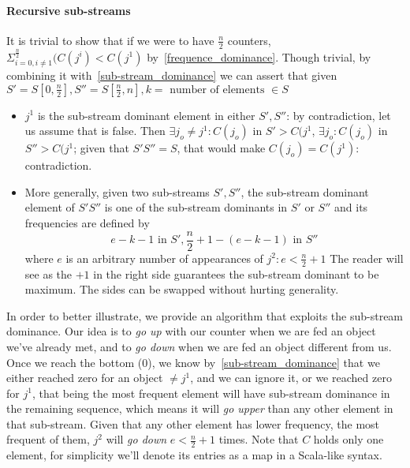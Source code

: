 \documentclass{article}
\begin{document}
\paragraph{Recursive sub-streams} It is trivial to show that if we were to have
$\frac{n}{2}$ counters, $\Sigma^{\frac{n}{2}}_{i = 0, i \neq 1}(C(j^{i}) < C(j^{1})$
by~\ref{frequence_dominance}.
Though trivial, by combining it with~\ref{sub-stream_dominance} we can assert that
given $S' = S[0, \frac{n}{2}], S'' = S[\frac{n}{2}, n], k = \textrm{ number of elements } \in S$
    \begin{itemize}
    \item \textbf{$j^{1}$} is the sub-stream dominant element in either $S', S''$:
    by contradiction, let us assume that is false. Then
    $\exists j_{o} \neq j^{1}: C(j_{o})$ in $S' > C(j^{1}$, $\exists j_{o}: C(j_{o})$ in $S'' > C(j^{1}$;
    given that $S'S'' = S$, that would make $C(j_{o}) = C(j^{1})$: contradiction.
    \item More generally, given two sub-streams $S', S''$, the sub-stream
    dominant element of $S'S''$ is one of the sub-stream dominants in
    $S'$ or $S''$ and its frequencies are defined by
        \begin{equation}
        e - k - 1\textrm{ in } S', \frac{n}{2} + 1 - (e - k - 1) \textrm{ in } S''
        \end{equation}
    where $e$ is an arbitrary number of appearances of $j^{2}: e < \frac{n}{2} + 1$
    The reader will see as the $+1$ in the right side guarantees the
    sub-stream dominant to be maximum.
    The sides can be swapped without hurting generality.
    \end{itemize}

In order to better illustrate, we provide an algorithm that exploits the
sub-stream dominance.
Our idea is to \emph{go up} with our counter when we are fed an object we've
already met, and to \emph{go down} when we are fed an object different from
us.
Once we reach the bottom (0), we know by~\ref{sub-stream_dominance} that
we either reached zero for an object $\neq j^{1}$, and we can ignore it,
or we reached zero for $j^{1}$, that being the most frequent element will
have sub-stream dominance in the remaining sequence, which means it will
\emph{go upper} than any other element in that sub-stream.
Given that any other element has lower frequency, the most frequent of
them, $j^{2}$ will \emph{go down} $e < \frac{n}{2} + 1$ times.
Note that $C$ holds only one element, for simplicity we'll denote its entries as
a map in a Scala-like syntax.
\end{document}
